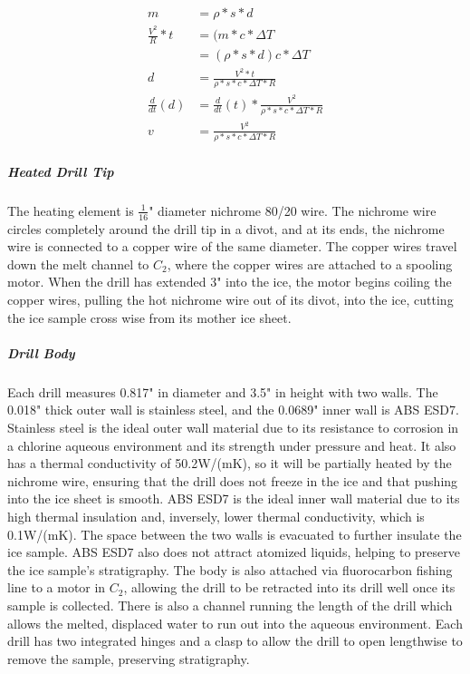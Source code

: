\documentclass{article}
\begin{document}
\begin{align*}
    m &= \rho * s*d \\
    \frac{V^2}{R}*t &= (m*c*\Delta T \\
    &= (\rho * s*d) c * \Delta T \\
    d &= \frac{V^2 * t}{\rho *s*c*\Delta T*R} \\
    \frac{d}{dt}(d) &= \frac{d}{dt}(t)* \frac{V^2}{\rho *s*c*\Delta T*R} \\
    v &= \frac{V^2}{\rho *s*c*\Delta T*R}
\end{align*}

\subparagraph{Heated Drill Tip}
The heating element is $\frac{1}{16}$" diameter nichrome 80/20 wire. The nichrome wire circles completely around the drill tip in a divot, and at its ends, the nichrome wire is connected to a copper wire of the same diameter. The copper wires travel down the melt channel to $C_2$, where the copper wires are attached to a spooling motor. When the drill has extended 3" into the ice, the motor begins coiling the copper wires, pulling the hot nichrome wire out of its divot, into the ice, cutting the ice sample cross wise from its mother ice sheet.
\subparagraph{Drill Body}
Each drill measures 0.817" in diameter and 3.5" in height with two walls. The 0.018" thick outer wall is stainless steel, and the 0.0689" inner wall is ABS ESD7. Stainless steel is the ideal outer wall material due to its resistance to corrosion in a chlorine aqueous environment and its strength under pressure and heat. It also has a thermal conductivity of 50.2W/(mK), so it will be partially heated by the nichrome wire, ensuring that the drill does not freeze in the ice and that pushing into the ice sheet is smooth. ABS ESD7 is the ideal inner wall material due to its high thermal insulation and, inversely, lower thermal conductivity, which is 0.1W/(mK). The space between the two walls is evacuated to further insulate the ice sample. ABS ESD7 also does not attract atomized liquids, helping to preserve the ice sample’s stratigraphy. The body is also attached via fluorocarbon fishing line to a motor in $C_2$, allowing the drill to be retracted into its drill well once its sample is collected. There is also a channel running the length of the drill which allows the melted, displaced water to run out into the aqueous environment. Each drill has two integrated hinges and a clasp to allow the drill to open lengthwise to remove the sample, preserving stratigraphy.
\end{document}
